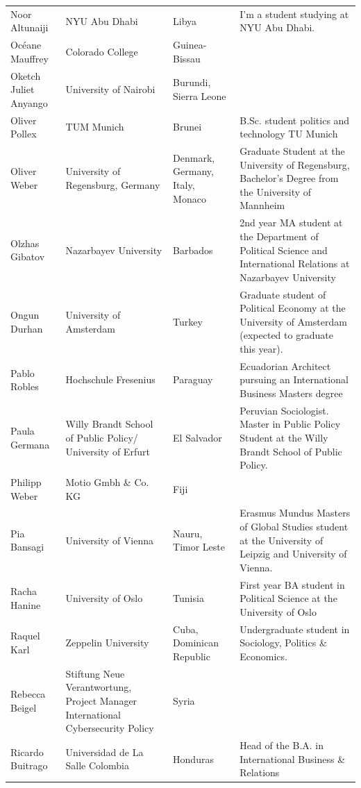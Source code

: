 \documentclass[
]{article}
\begin{document}
\begin{longtable}[t]{l>{\raggedright\arraybackslash}p{2cm}>{\raggedright\arraybackslash}p{2cm}>{\raggedright\arraybackslash}p{3cm}}
\addlinespace
\rowcolor{gray!6}  Noor Altunaiji & NYU Abu Dhabi & Libya & I'm a student studying at NYU Abu Dhabi.\\
Océane Mauffrey & Colorado College & Guinea-Bissau & \\
\rowcolor{gray!6}  Oketch Juliet Anyango & University of Nairobi & Burundi, Sierra Leone & \\
Oliver Pollex & TUM Munich & Brunei & B.Sc. student politics and technology TU Munich\\
\rowcolor{gray!6}  Oliver Weber & University of Regensburg, Germany & Denmark, Germany, Italy, Monaco & Graduate Student at the University of Regensburg, Bachelor's Degree from the University of Mannheim\\
\addlinespace
Olzhas Gibatov & Nazarbayev University & Barbados & 2nd year MA student at the Department of Political Science and International Relations at Nazarbayev University\\
\rowcolor{gray!6}  Ongun Durhan & University of Amsterdam & Turkey & Graduate student of Political Economy at the University of Amsterdam (expected to graduate this year).\\
Pablo Robles & Hochschule Fresenius & Paraguay & Ecuadorian Architect pursuing an International Business Masters degree\\
\rowcolor{gray!6}  Paula Germana & Willy Brandt School of Public Policy/ University of Erfurt & El Salvador & Peruvian Sociologist. Master in Public Policy Student at the Willy Brandt School of Public Policy.\\
Philipp Weber & Motio Gmbh \& Co. KG & Fiji & \\
\addlinespace
\rowcolor{gray!6}  Pia Bansagi & University of Vienna & Nauru, Timor Leste & Erasmus Mundus Masters of Global Studies student at the University of Leipzig and University of Vienna.\\
Racha Hanine & University of Oslo & Tunisia & First year BA student in Political Science at the University of Oslo\\
\rowcolor{gray!6}  Raquel Karl & Zeppelin University & Cuba, Dominican Republic & Undergraduate student in Sociology, Politics \& Economics.\\
Rebecca Beigel & Stiftung Neue Verantwortung, Project Manager International Cybersecurity Policy & Syria & \\
\rowcolor{gray!6}  Ricardo Buitrago & Universidad de La Salle Colombia & Honduras & Head of the B.A. in International Business \& Relations\\

\end{longtable}
\end{document}
